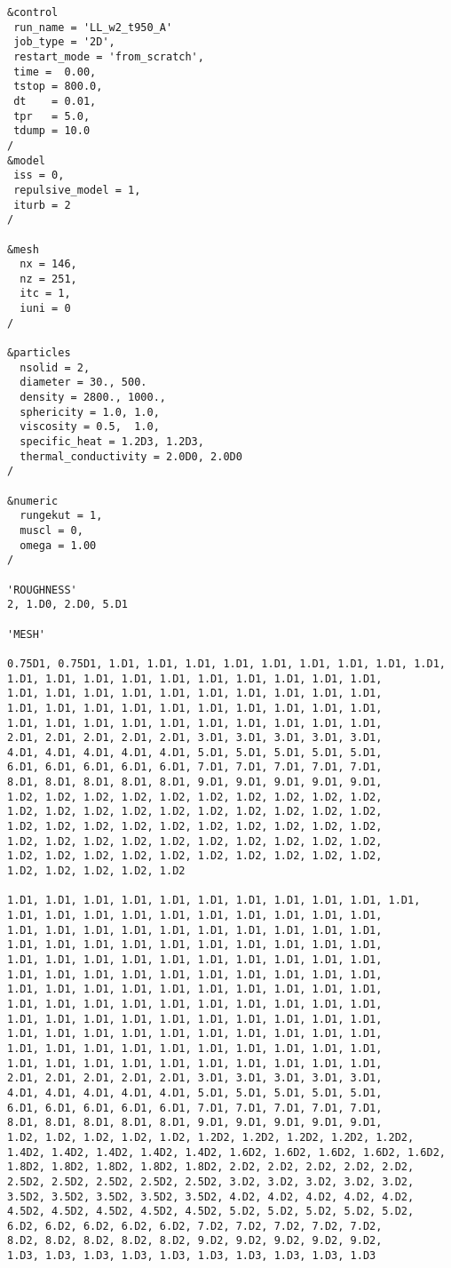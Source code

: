 \begin{verbatim}
&control
 run_name = 'LL_w2_t950_A'
 job_type = '2D',
 restart_mode = 'from_scratch',
 time =  0.00,
 tstop = 800.0,
 dt    = 0.01,
 tpr   = 5.0,
 tdump = 10.0
/
&model
 iss = 0,
 repulsive_model = 1,
 iturb = 2
/

&mesh
  nx = 146,
  nz = 251,
  itc = 1,
  iuni = 0
/

&particles
  nsolid = 2, 
  diameter = 30., 500.
  density = 2800., 1000.,
  sphericity = 1.0, 1.0,
  viscosity = 0.5,  1.0,
  specific_heat = 1.2D3, 1.2D3, 
  thermal_conductivity = 2.0D0, 2.0D0
/

&numeric
  rungekut = 1,
  muscl = 0,
  omega = 1.00
/

'ROUGHNESS'
2, 1.D0, 2.D0, 5.D1

'MESH'

0.75D1, 0.75D1, 1.D1, 1.D1, 1.D1, 1.D1, 1.D1, 1.D1, 1.D1, 1.D1, 1.D1,
1.D1, 1.D1, 1.D1, 1.D1, 1.D1, 1.D1, 1.D1, 1.D1, 1.D1, 1.D1,
1.D1, 1.D1, 1.D1, 1.D1, 1.D1, 1.D1, 1.D1, 1.D1, 1.D1, 1.D1,
1.D1, 1.D1, 1.D1, 1.D1, 1.D1, 1.D1, 1.D1, 1.D1, 1.D1, 1.D1,
1.D1, 1.D1, 1.D1, 1.D1, 1.D1, 1.D1, 1.D1, 1.D1, 1.D1, 1.D1,
2.D1, 2.D1, 2.D1, 2.D1, 2.D1, 3.D1, 3.D1, 3.D1, 3.D1, 3.D1,
4.D1, 4.D1, 4.D1, 4.D1, 4.D1, 5.D1, 5.D1, 5.D1, 5.D1, 5.D1,
6.D1, 6.D1, 6.D1, 6.D1, 6.D1, 7.D1, 7.D1, 7.D1, 7.D1, 7.D1,
8.D1, 8.D1, 8.D1, 8.D1, 8.D1, 9.D1, 9.D1, 9.D1, 9.D1, 9.D1,
1.D2, 1.D2, 1.D2, 1.D2, 1.D2, 1.D2, 1.D2, 1.D2, 1.D2, 1.D2,
1.D2, 1.D2, 1.D2, 1.D2, 1.D2, 1.D2, 1.D2, 1.D2, 1.D2, 1.D2,
1.D2, 1.D2, 1.D2, 1.D2, 1.D2, 1.D2, 1.D2, 1.D2, 1.D2, 1.D2,
1.D2, 1.D2, 1.D2, 1.D2, 1.D2, 1.D2, 1.D2, 1.D2, 1.D2, 1.D2,
1.D2, 1.D2, 1.D2, 1.D2, 1.D2, 1.D2, 1.D2, 1.D2, 1.D2, 1.D2,
1.D2, 1.D2, 1.D2, 1.D2, 1.D2

1.D1, 1.D1, 1.D1, 1.D1, 1.D1, 1.D1, 1.D1, 1.D1, 1.D1, 1.D1, 1.D1,
1.D1, 1.D1, 1.D1, 1.D1, 1.D1, 1.D1, 1.D1, 1.D1, 1.D1, 1.D1,
1.D1, 1.D1, 1.D1, 1.D1, 1.D1, 1.D1, 1.D1, 1.D1, 1.D1, 1.D1,
1.D1, 1.D1, 1.D1, 1.D1, 1.D1, 1.D1, 1.D1, 1.D1, 1.D1, 1.D1,
1.D1, 1.D1, 1.D1, 1.D1, 1.D1, 1.D1, 1.D1, 1.D1, 1.D1, 1.D1,
1.D1, 1.D1, 1.D1, 1.D1, 1.D1, 1.D1, 1.D1, 1.D1, 1.D1, 1.D1,
1.D1, 1.D1, 1.D1, 1.D1, 1.D1, 1.D1, 1.D1, 1.D1, 1.D1, 1.D1,
1.D1, 1.D1, 1.D1, 1.D1, 1.D1, 1.D1, 1.D1, 1.D1, 1.D1, 1.D1,
1.D1, 1.D1, 1.D1, 1.D1, 1.D1, 1.D1, 1.D1, 1.D1, 1.D1, 1.D1,
1.D1, 1.D1, 1.D1, 1.D1, 1.D1, 1.D1, 1.D1, 1.D1, 1.D1, 1.D1,
1.D1, 1.D1, 1.D1, 1.D1, 1.D1, 1.D1, 1.D1, 1.D1, 1.D1, 1.D1,
1.D1, 1.D1, 1.D1, 1.D1, 1.D1, 1.D1, 1.D1, 1.D1, 1.D1, 1.D1,
2.D1, 2.D1, 2.D1, 2.D1, 2.D1, 3.D1, 3.D1, 3.D1, 3.D1, 3.D1,
4.D1, 4.D1, 4.D1, 4.D1, 4.D1, 5.D1, 5.D1, 5.D1, 5.D1, 5.D1,
6.D1, 6.D1, 6.D1, 6.D1, 6.D1, 7.D1, 7.D1, 7.D1, 7.D1, 7.D1,
8.D1, 8.D1, 8.D1, 8.D1, 8.D1, 9.D1, 9.D1, 9.D1, 9.D1, 9.D1,
1.D2, 1.D2, 1.D2, 1.D2, 1.D2, 1.2D2, 1.2D2, 1.2D2, 1.2D2, 1.2D2,
1.4D2, 1.4D2, 1.4D2, 1.4D2, 1.4D2, 1.6D2, 1.6D2, 1.6D2, 1.6D2, 1.6D2,
1.8D2, 1.8D2, 1.8D2, 1.8D2, 1.8D2, 2.D2, 2.D2, 2.D2, 2.D2, 2.D2, 
2.5D2, 2.5D2, 2.5D2, 2.5D2, 2.5D2, 3.D2, 3.D2, 3.D2, 3.D2, 3.D2, 
3.5D2, 3.5D2, 3.5D2, 3.5D2, 3.5D2, 4.D2, 4.D2, 4.D2, 4.D2, 4.D2, 
4.5D2, 4.5D2, 4.5D2, 4.5D2, 4.5D2, 5.D2, 5.D2, 5.D2, 5.D2, 5.D2, 
6.D2, 6.D2, 6.D2, 6.D2, 6.D2, 7.D2, 7.D2, 7.D2, 7.D2, 7.D2, 
8.D2, 8.D2, 8.D2, 8.D2, 8.D2, 9.D2, 9.D2, 9.D2, 9.D2, 9.D2, 
1.D3, 1.D3, 1.D3, 1.D3, 1.D3, 1.D3, 1.D3, 1.D3, 1.D3, 1.D3


\end{verbatim}
